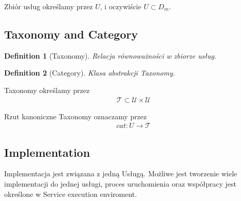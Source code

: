 \documentclass[a4paper,10pt]{article}
\newtheorem{defi}{Definition}[section]
\begin{document}
Zbiór usług określamy przez $U$, i oczywiście $U \subset D_m$.

\subsection{Taxonomy and Category}

\begin{defi}[Taxonomy]
  Relacja równoważności w zbiorze usług.
\end{defi}

\begin{defi}[Category]
  Klasa abstrakcji Taxonomy.
\end{defi}

Taxonomy określamy przez 
\begin{eqnarray}
\mathcal{T} \subset \mathcal{U}  \times \mathcal{U} 
\end{eqnarray}

Rzut kanoniczne Taxonomy oznaczamy przez
\begin{eqnarray}
cat: U \rightarrow \mathcal{T}
\end{eqnarray}

\subsection{Implementation}

% 
% 

Implementacja jest związana z jedną Usługą. Możliwe jest tworzenie wiele implementacji do jednej usługi, proces uruchomienia oraz współpracy jest określone w Service execution enviroment.
\end{document}
